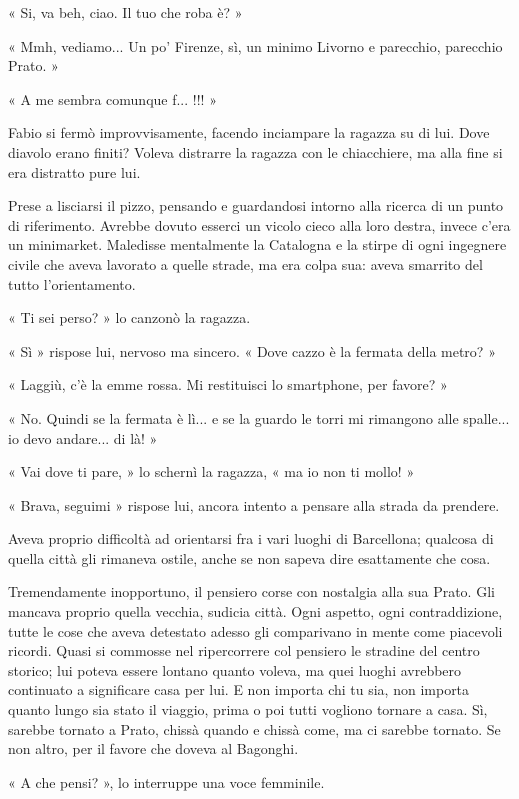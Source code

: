 « Si, va beh, ciao. Il tuo che roba è? »

« Mmh, vediamo... Un po' Firenze, sì, un minimo Livorno e parecchio, parecchio Prato. »

« A me sembra comunque f... !!! »

Fabio si fermò improvvisamente, facendo inciampare la ragazza su di lui. Dove diavolo erano finiti? Voleva distrarre la ragazza con le chiacchiere, ma alla fine si era distratto pure lui.

Prese a lisciarsi il pizzo, pensando e guardandosi intorno alla ricerca di un punto di riferimento. Avrebbe dovuto esserci un vicolo cieco alla loro destra, invece c'era un minimarket. Maledisse mentalmente la Catalogna e la stirpe di ogni ingegnere civile che aveva lavorato a quelle strade, ma era colpa sua: aveva smarrito del tutto l'orientamento.

« Ti sei perso? » lo canzonò la ragazza.

« Sì » rispose lui, nervoso ma sincero. « Dove cazzo è la fermata della metro? »

« Laggiù, c'è la emme rossa. Mi restituisci lo smartphone, per favore? »

« No. Quindi se la fermata è lì... e se la guardo le torri mi rimangono alle spalle... io devo andare... di là! »

« Vai dove ti pare, » lo schernì la ragazza, « ma io non ti mollo! »

« Brava, seguimi » rispose lui, ancora intento a pensare alla strada da prendere.

Aveva proprio difficoltà ad orientarsi fra i vari luoghi di Barcellona; qualcosa di quella città gli rimaneva ostile, anche se non sapeva dire esattamente che cosa.

Tremendamente inopportuno, il pensiero corse con nostalgia alla sua Prato. Gli mancava proprio quella vecchia, sudicia città. Ogni aspetto, ogni contraddizione, tutte le cose che aveva detestato adesso gli comparivano in mente come piacevoli ricordi. Quasi si commosse nel ripercorrere col pensiero le stradine del centro storico; lui poteva essere lontano quanto voleva, ma quei luoghi avrebbero continuato a significare casa per lui. E non importa chi tu sia, non importa quanto lungo sia stato il viaggio, prima o poi tutti vogliono tornare a casa. Sì, sarebbe tornato a Prato, chissà quando e chissà come, ma ci sarebbe tornato. Se non altro, per il favore che doveva al Bagonghi.

« A che pensi? », lo interruppe una voce femminile.

